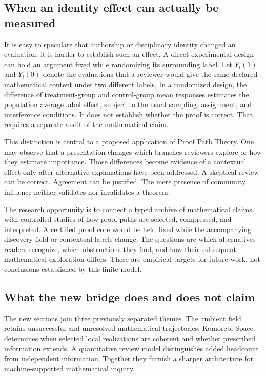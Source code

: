 \documentclass[11pt,oneside]{article}
\theoremstyle{definition}
\theoremstyle{remark}
\begin{document}
\subsection{When an identity effect can actually be measured}

It is easy to speculate that authorship or disciplinary identity changed an evaluation; it is harder to establish such an effect. A direct experimental design can hold an argument fixed while randomizing its surrounding label. Let $Y_i(1)$ and $Y_i(0)$ denote the evaluations that a reviewer would give the same declared mathematical content under two different labels. In a randomized design, the difference of treatment-group and control-group mean responses estimates the population average label effect, subject to the usual sampling, assignment, and interference conditions. It does not establish whether the proof is correct. That requires a separate audit of the mathematical claim.

This distinction is central to a proposed application of Proof Path Theory. One may observe that a presentation changes which branches reviewers explore or how they estimate importance. Those differences become evidence of a contextual effect only after alternative explanations have been addressed. A skeptical review can be correct. Agreement can be justified. The mere presence of community influence neither validates nor invalidates a theorem.

The research opportunity is to connect a typed archive of mathematical claims with controlled studies of how proof paths are selected, compressed, and interpreted. A certified proof core would be held fixed while the accompanying discovery field or contextual labels change. The questions are which alternatives readers recognize, which obstructions they find, and how their subsequent mathematical exploration differs. These are empirical targets for future work, not conclusions established by this finite model.

\subsection{What the new bridge does and does not claim}

The new sections join three previously separated themes. The ambient field retains unsuccessful and unresolved mathematical trajectories. Komorebi Space determines when selected local realizations are coherent and whether prescribed information extends. A quantitative review model distinguishes added headcount from independent information. Together they furnish a sharper architecture for machine-supported mathematical inquiry.
\end{document}
